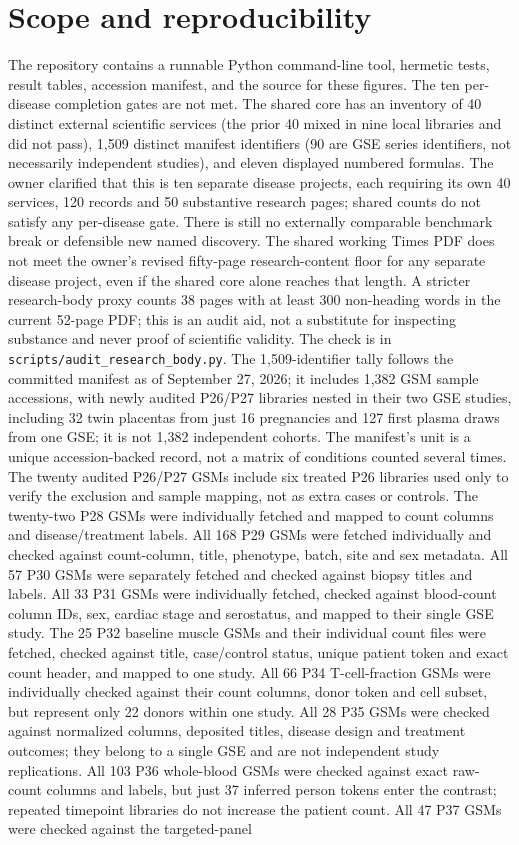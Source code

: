 \documentclass[11pt,a4paper]{article}
\begin{document}
\section{Scope and reproducibility}
The repository contains a runnable Python command-line tool, hermetic tests, result tables, accession manifest, and the source for these figures. The ten per-disease completion gates are not met. The shared core has an inventory of 40 distinct external scientific services (the prior 40 mixed in nine local libraries and did not pass), 1,509 distinct manifest identifiers (90 are GSE series identifiers, not necessarily independent studies), and eleven displayed numbered formulas. The owner clarified that this is ten separate disease projects, each requiring its own 40 services, 120 records and 50 substantive research pages; shared counts do not satisfy any per-disease gate. There is still no externally comparable benchmark break or defensible new named discovery. The shared working Times PDF does not meet the owner's revised fifty-page research-content floor for any separate disease project, even if the shared core alone reaches that length. A stricter research-body proxy counts 38 pages with at least 300 non-heading words in the current 52-page PDF; this is an audit aid, not a substitute for inspecting substance and never proof of scientific validity. The check is in \texttt{scripts/audit\_research\_body.py}. The 1,509-identifier tally follows the committed manifest as of September 27, 2026; it includes 1,382 GSM sample accessions, with newly audited P26/P27 libraries nested in their two GSE studies, including 32 twin placentas from just 16 pregnancies and 127 first plasma draws from one GSE; it is not 1,382 independent cohorts. The manifest's unit is a unique accession-backed record, not a matrix of conditions counted several times. The twenty audited P26/P27 GSMs include six treated P26 libraries used only to verify the exclusion and sample mapping, not as extra cases or controls. The twenty-two P28 GSMs were individually fetched and mapped to count columns and disease/treatment labels. All 168 P29 GSMs were fetched individually and checked against count-column, title, phenotype, batch, site and sex metadata. All 57 P30 GSMs were separately fetched and checked against biopsy titles and labels. All 33 P31 GSMs were individually fetched, checked against blood-count column IDs, sex, cardiac stage and serostatus, and mapped to their single GSE study. The 25 P32 baseline muscle GSMs and their individual count files were fetched, checked against title, case/control status, unique patient token and exact count header, and mapped to one study. All 66 P34 T-cell-fraction GSMs were individually checked against their count columns, donor token and cell subset, but represent only 22 donors within one study. All 28 P35 GSMs were checked against normalized columns, deposited titles, disease design and treatment outcomes; they belong to a single GSE and are not independent study replications. All 103 P36 whole-blood GSMs were checked against exact raw-count columns and labels, but just 37 inferred person tokens enter the contrast; repeated timepoint libraries do not increase the patient count. All 47 P37 GSMs were checked against the targeted-panel 
\end{document}
